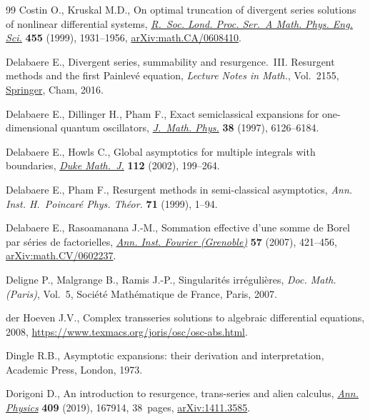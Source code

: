 \documentclass[pdftex]{sigma}
\numberwithin{equation}{section}
\begin{document}
\begin{thebibliography}{99}
Costin O., Kruskal M.D., On optimal truncation of divergent series solutions of
 nonlinear differential systems,
 \href{https://doi.org/10.1098/rspa.1999.0387}{\textit{R.~Soc. Lond. Proc.
 Ser.~A Math. Phys. Eng. Sci.}} \textbf{455} (1999), 1931--1956,
 \href{http://arxiv.org/abs/math.CA/0608410}{arXiv:math.CA/0608410}.

Delabaere E., Divergent series, summability and resurgence.~{III}. {R}esurgent methods and the first Painlev\'e equation,
 \textit{Lecture Notes in Math.}, Vol.~2155,
 \href{https://doi.org/10.1007/978-3-319-29000-3}{Springer}, Cham, 2016.

Delabaere E., Dillinger H., Pham F., Exact semiclassical expansions for
 one-dimensional quantum oscillators,
 \href{https://doi.org/10.1063/1.532206}{\textit{J.~Math. Phys.}} \textbf{38}
 (1997), 6126--6184.

Delabaere E., Howls C., Global asymptotics for multiple integrals with
 boundaries, \href{https://doi.org/10.1215/S0012-9074-02-11221-6}{\textit{Duke
 Math.~J.}} \textbf{112} (2002), 199--264.

Delabaere E., Pham F., Resurgent methods in semi-classical asymptotics,
 \textit{Ann. Inst. H.~Poincar\'e Phys. Th\'eor.} \textbf{71} (1999), 1--94.

Delabaere E., Rasoamanana J.-M., Sommation effective d'une somme de {B}orel par
 s\'eries de factorielles,
 \href{https://doi.org/10.5802/aif.2263}{\textit{Ann. Inst. Fourier
 (Grenoble)}} \textbf{57} (2007), 421--456,
 \href{http://arxiv.org/abs/math.CV/0602237}{arXiv:math.CV/0602237}.

Deligne P., Malgrange B., Ramis J.-P., Singularit\'es irr\'eguli\`eres,
 \textit{Doc. Math. (Paris)}, Vol.~5, Soci\'et\'e Math\'ematique de France,
 Paris, 2007.

der Hoeven J.V., Complex transseries solutions to algebraic differential
 equations, 2008, \url{https://www.texmacs.org/joris/osc/osc-abs.html}.

Dingle R.B., Asymptotic expansions: their derivation and interpretation,
Academic Press, London, 1973.

Dorigoni D., An introduction to resurgence, trans-series and alien calculus,
 \href{https://doi.org/10.1016/j.aop.2019.167914}{\textit{Ann. Physics}}
 \textbf{409} (2019), 167914, 38~pages,
 \href{http://arxiv.org/abs/1411.3585}{arXiv:1411.3585}.


\end{thebibliography}
\end{document}

